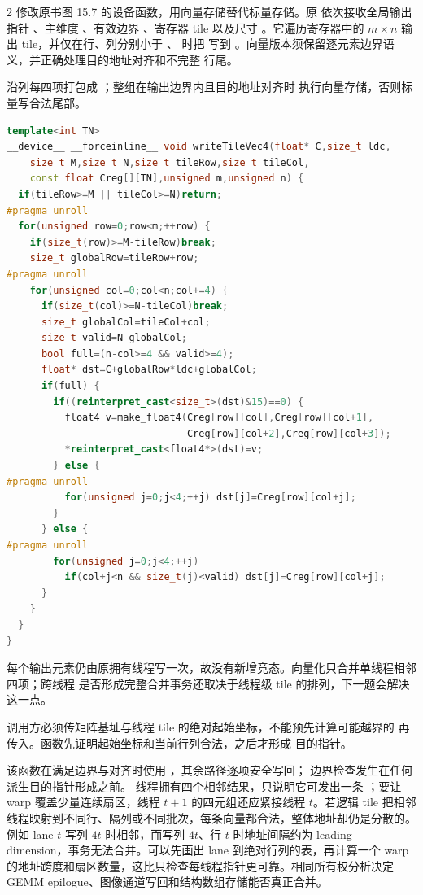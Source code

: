 \begin{solutionexercise}{2}
\problemheading 修改原书图 15.7 的设备函数，用向量存储替代标量存储。原
 依次接收全局输出指针 、主维度 、有效边界
、寄存器 tile  以及尺寸 。它遍历寄存器中的
$m\times n$ 输出 tile，并仅在行、列分别小于 、 时把
 写到
。向量版本须保留逐元素边界语义，并正确处理目的地址对齐和不完整
行尾。

\approachheading 沿列每四项打包成 ；整组在输出边界内且目的地址对齐时
执行向量存储，否则标量写合法尾部。

\answerheading
\begin{lstlisting}[language=C++]
template<int TN>
__device__ __forceinline__ void writeTileVec4(float* C,size_t ldc,
    size_t M,size_t N,size_t tileRow,size_t tileCol,
    const float Creg[][TN],unsigned m,unsigned n) {
  if(tileRow>=M || tileCol>=N)return;
#pragma unroll
  for(unsigned row=0;row<m;++row) {
    if(size_t(row)>=M-tileRow)break;
    size_t globalRow=tileRow+row;
#pragma unroll
    for(unsigned col=0;col<n;col+=4) {
      if(size_t(col)>=N-tileCol)break;
      size_t globalCol=tileCol+col;
      size_t valid=N-globalCol;
      bool full=(n-col>=4 && valid>=4);
      float* dst=C+globalRow*ldc+globalCol;
      if(full) {
        if((reinterpret_cast<size_t>(dst)&15)==0) {
          float4 v=make_float4(Creg[row][col],Creg[row][col+1],
                               Creg[row][col+2],Creg[row][col+3]);
          *reinterpret_cast<float4*>(dst)=v;
        } else {
#pragma unroll
          for(unsigned j=0;j<4;++j) dst[j]=Creg[row][col+j];
        }
      } else {
#pragma unroll
        for(unsigned j=0;j<4;++j)
          if(col+j<n && size_t(j)<valid) dst[j]=Creg[row][col+j];
      }
    }
  }
}
\end{lstlisting}
每个输出元素仍由原拥有线程写一次，故没有新增竞态。向量化只合并单线程相邻四项；跨线程
是否形成完整合并事务还取决于线程级 tile 的排列，下一题会解决这一点。

调用方必须传矩阵基址与线程 tile 的绝对起始坐标，不能预先计算可能越界的
 再传入。函数先证明起始坐标和当前行列合法，之后才形成
目的指针。

\conclusionheading 该函数在满足边界与对齐时使用 ，其余路径逐项安全写回；
边界检查发生在任何派生目的指针形成之前。
\discussionheading
{}线程拥有四个相邻结果，只说明它可发出一条 ；要让 warp 覆盖少量连续扇区，线程 $t+1$ 的四元组还应紧接线程 $t$。若逻辑 tile 把相邻线程映射到不同行、隔列或不同批次，每条向量都合法，整体地址却仍是分散的。例如 lane $t$ 写列 $4t$ 时相邻，而写列 $4t$、行 $t$ 时地址间隔约为 leading dimension，事务无法合并。可以先画出 lane 到绝对行列的表，再计算一个 warp 的地址跨度和扇区数量，这比只检查每线程指针更可靠。相同所有权分析决定 GEMM epilogue、图像通道写回和结构数组存储能否真正合并。


\end{solutionexercise}
